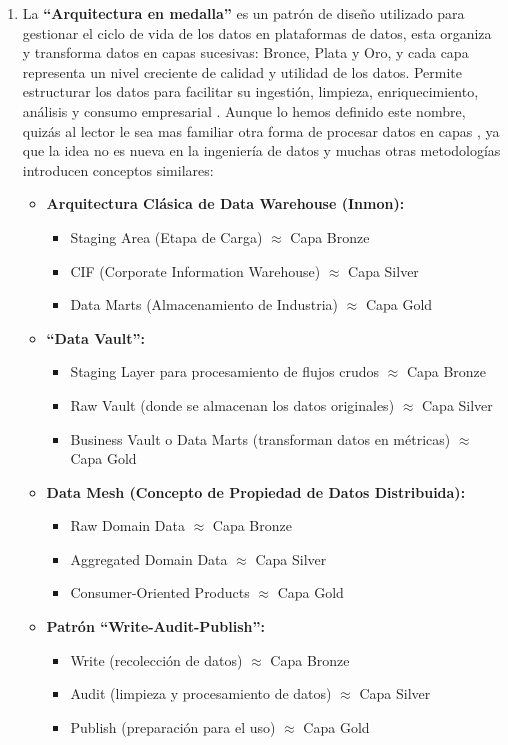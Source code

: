 \begin{enumerate}
		\item La \textbf{``Arquitectura en medalla''} \label{def11} es un patrón de diseño utilizado para gestionar el ciclo de vida de los datos en plataformas de datos, esta organiza y transforma datos en capas sucesivas: Bronce, Plata y Oro, y cada capa representa un nivel creciente de calidad y utilidad de los datos. Permite estructurar los datos para facilitar su ingestión, limpieza, enriquecimiento, análisis y consumo empresarial \citep{MedallionMicrosoft}. 
		Aunque lo hemos definido este nombre, quizás al lector le sea mas familiar otra forma de procesar datos en capas \citep{MedallionMedium}, ya que la idea no es nueva en la ingeniería de datos y muchas otras metodologías introducen conceptos similares:
		\begin{itemize}
			\item \textbf{Arquitectura Clásica de Data Warehouse (Inmon):}
			\begin{itemize}
				\item Staging Area (Etapa de Carga) $\approx$ Capa Bronze
				\item CIF (Corporate Information Warehouse) $\approx$ Capa Silver
				\item Data Marts (Almacenamiento de Industria) $\approx$ Capa Gold
			\end{itemize}
			\item \textbf{``Data Vault'':}
			\begin{itemize}
				\item Staging Layer para procesamiento de flujos crudos $\approx$ Capa Bronze
				\item Raw Vault (donde se almacenan los datos originales) $\approx$ Capa Silver
				\item Business Vault o Data Marts (transforman datos en métricas) $\approx$ Capa Gold
			\end{itemize}
			\item \textbf{Data Mesh (Concepto de Propiedad de Datos Distribuida):}
			\begin{itemize}
				\item Raw Domain Data $\approx$ Capa Bronze
				\item Aggregated Domain Data $\approx$ Capa Silver
				\item Consumer-Oriented Products $\approx$ Capa Gold
			\end{itemize}
			\item \textbf{Patrón ``Write-Audit-Publish'':}
			\begin{itemize}
				\item Write (recolección de datos) $\approx$ Capa Bronze
				\item Audit (limpieza y procesamiento de datos) $\approx$ Capa Silver
				\item Publish (preparación para el uso) $\approx$ Capa Gold
			\end{itemize}
		\end{itemize}
		

\end{enumerate}
